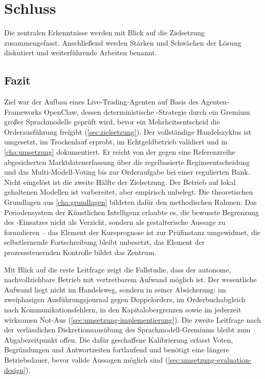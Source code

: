 
\chapter{Schluss}
\label{cha:schluss}

Die zentralen Erkenntnisse werden mit Blick auf die Zielsetzung zusammengefasst.
Anschließend werden Stärken und Schwächen der Lösung diskutiert und weiterführende Arbeiten
benannt.

\section{Fazit}
\label{sec:fazit}

Ziel war der Aufbau eines Live-Trading-Agenten auf Basis des
Agenten-Frameworks OpenClaw, dessen deterministische -Strategie
durch ein Gremium großer Sprachmodelle geprüft wird, bevor ein Mehrheitsentscheid
die Orderausführung freigibt (\cref{sec:zielsetzung}). Der vollständige Handelszyklus ist umgesetzt, im Trockenlauf erprobt, im Echtgeldbetrieb
validiert und in \cref{cha:umsetzung} dokumentiert. Er reicht von der gegen eine
Referenzreihe abgesicherten Marktdatenerfassung über die regelbasierte Regimeentscheidung
und das Multi-Modell-Voting bis zur Orderaufgabe bei einer regulierten Bank. Nicht eingelöst
ist die zweite Hälfte der Zielsetzung. Der Betrieb auf lokal gehaltenen Modellen ist
vorbereitet, aber empirisch unbelegt. Die theoretischen Grundlagen aus
\cref{cha:grundlagen} bildeten dafür den methodischen Rahmen: Das Periodensystem
der Künstlichen Intelligenz erlaubte es, die bewusste Begrenzung des
-Einsatzes nicht als Verzicht, sondern als gestalterische Aussage
zu formulieren -- das Element der Kursprognose ist zur Prüfinstanz umgewidmet, die selbstlernende Fortschreibung bleibt unbesetzt, das Element der prozesssteuernden Kontrolle
bildet das Zentrum.

Mit Blick auf die erste Leitfrage zeigt die Fallstudie, dass der autonome, nachvollziehbare Betrieb mit vertretbarem Aufwand möglich ist. Der wesentliche Aufwand liegt nicht im Handelsweg, sondern in seiner Absicherung: im
zweiphasigen Ausführungsjournal gegen Doppelorders, im Orderbuchabgleich nach
Kommunikationsfehlern, in den Kapitalobergrenzen sowie im jederzeit wirksamen
Not-Aus (\cref{sec:umsetzung-implementierung}). Die zweite Leitfrage nach der
verlässlichen Diskretionsausübung des Sprachmodell-Gremiums bleibt zum Abgabezeitpunkt offen. 
Die dafür geschaffene Kalibrierung erfasst Voten, Begründungen und Antwortzeiten
fortlaufend und benötigt eine längere Betriebsdauer, bevor valide Aussagen möglich
sind (\cref{sec:umsetzung-evaluation-design}).

